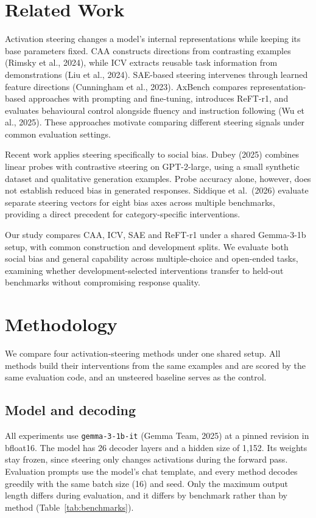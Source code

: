 \documentclass{article}
\begin{document}
\section{Related Work}

Activation steering changes a model's internal representations while keeping its base parameters fixed. CAA constructs directions from contrasting examples (Rimsky et al., 2024), while ICV extracts reusable task information from demonstrations (Liu et al., 2024). SAE-based steering intervenes through learned feature directions (Cunningham et al., 2023). AxBench compares representation-based approaches with prompting and fine-tuning, introduces ReFT-r1, and evaluates behavioural control alongside fluency and instruction following (Wu et al., 2025). These approaches motivate comparing different steering signals under common evaluation settings.

Recent work applies steering specifically to social bias. Dubey (2025) combines linear probes with contrastive steering on GPT-2-large, using a small synthetic dataset and qualitative generation examples. Probe accuracy alone, however, does not establish reduced bias in generated responses. Siddique et al.\ (2026) evaluate separate steering vectors for eight bias axes across multiple benchmarks, providing a direct precedent for category-specific interventions.

Our study compares CAA, ICV, SAE and ReFT-r1 under a shared Gemma-3-1b setup, with common construction and development splits. We evaluate both social bias and general capability across multiple-choice and open-ended tasks, examining whether development-selected interventions transfer to held-out benchmarks without compromising response quality.

\section{Methodology}
\label{sec:method}

We compare four activation-steering methods under one shared setup. All methods build their interventions from the same examples and are scored by the same evaluation code, and an unsteered baseline serves as the control.

\subsection{Model and decoding}

All experiments use \texttt{gemma-3-1b-it} (Gemma Team, 2025) at a pinned revision in bfloat16. The model has 26 decoder layers and a hidden size of 1,152. Its weights stay frozen, since steering only changes activations during the forward pass. Evaluation prompts use the model's chat template, and every method decodes greedily with the same batch size (16) and seed. Only the maximum output length differs during evaluation, and it differs by benchmark rather than by method (Table~\ref{tab:benchmarks}).
\end{document}
